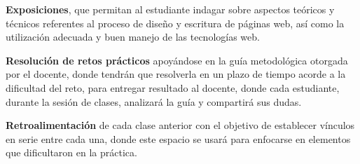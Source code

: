 \textbf{Exposiciones}, que permitan al estudiante indagar sobre aspectos teóricos y técnicos referentes al proceso de diseño y escritura de páginas web, así como la utilización adecuada y buen manejo de las tecnologías web.

\textbf{Resolución de retos prácticos} apoyándose en la guía metodológica otorgada por el docente, donde tendrán que resolverla en un plazo de tiempo acorde a la dificultad del reto, para entregar resultado al docente, donde cada estudiante, durante la sesión de clases, analizará la guía y compartirá sus dudas.

\textbf{Retroalimentación} de cada clase anterior con el objetivo de establecer vínculos en serie entre cada una, donde este espacio se usará para enfocarse en elementos que dificultaron en la práctica.